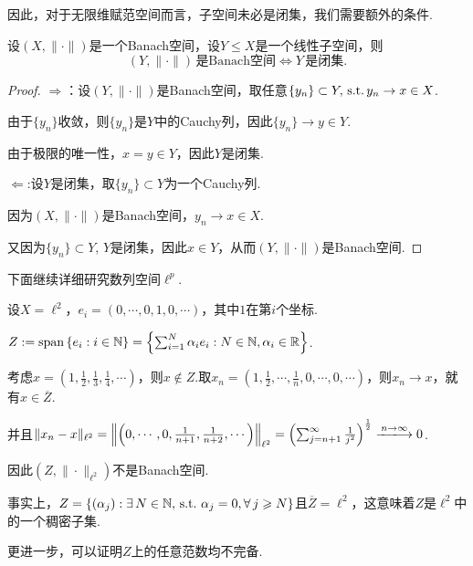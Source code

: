 因此，对于无限维赋范空间而言，子空间未必是闭集，我们需要额外的条件.
\begin{theorem}
    设$(X,\|\cdot\|)$是一个Banach空间，设$Y\leq X$是一个线性子空间，则
    \begin{equation*}
        (Y,\|\cdot\|)\,\text{是Banach空间}\iff Y\,\text{是闭集}.
    \end{equation*}
\end{theorem}
\begin{proof}
    $\Rightarrow$：设$(Y,\|\cdot\|)$是Banach空间，取任意$\{y_n\}\subset Y,\operatorname{\,\text{s.t.}} y_n\to x\in X$.\par
    由于$\{y_n\}$收敛，则$\{y_n\}$是$Y$中的Cauchy列，因此$\{y_n\}\to y\in Y$.\par
    由于极限的唯一性，$x=y\in Y$，因此$Y$是闭集.\par
    $\Leftarrow$:设$Y$是闭集，取$\{y_n\}\subset Y$为一个Cauchy列.\par
    因为$(X,\|\cdot\|)$是Banach空间，$y_n\to x\in X$.\par
    又因为$\{y_n\}\subset Y$, $Y$是闭集，因此$x\in Y$，从而$(Y,\|\cdot\|)$是Banach空间.
\end{proof}

下面继续详细研究数列空间$\ell^p$.\par
\begin{instance}
    设$X=\ell^2$，$e_i=(0,\cdots,0,1,0,\cdots)$，其中$1$在第$i$个坐标.\par
    $Z:=\mathrm{span}\,\{e_i:i\in\mathbb{N}\}=\left\{\sum_{i=1}^N\alpha_i e_i:N\in\mathbb{N},\alpha_i\in\mathbb{R}\right\}$.\par
    考虑$x=\left(1,\frac{1}{2},\frac{1}{3},\frac{1}{4},\cdots\right)$，则$x\notin Z$.取$x_n=\left(1,\frac{1}{2},\cdots,\frac{1}{n},0,\cdots,0,\cdots\right)$，则$x_n\to x$，就有$x\in\overline{Z}$.\par
    并且$\|x_n-x\|_{\ell^2}=\left\|\left(0,\cdots,0,\frac{1}{n+1},\frac{1}{n+2},\cdots\right)\right\|_{\ell^2}=\left(\sum_{j=n+1}^\infty\frac{1}{j^2}\right)^{\frac{1}{2}}\xlongrightarrow{n\to\infty}0$.\par
    因此$\left(Z,\|\cdot\|_{\ell^2}\right)$不是Banach空间.\par
    事实上，$Z=\left\{(\alpha_j):\exists\, N\in\mathbb{N},\operatorname{\,\text{s.t.}}\,\alpha_j=0,\forall\,j\geqslant N\right\}$且$\overline{Z}=\ell^2$，这意味着$Z$是$\ell^2$中的一个稠密子集.\par
    更进一步，可以证明$Z$上的任意范数均不完备.
\end{instance}

